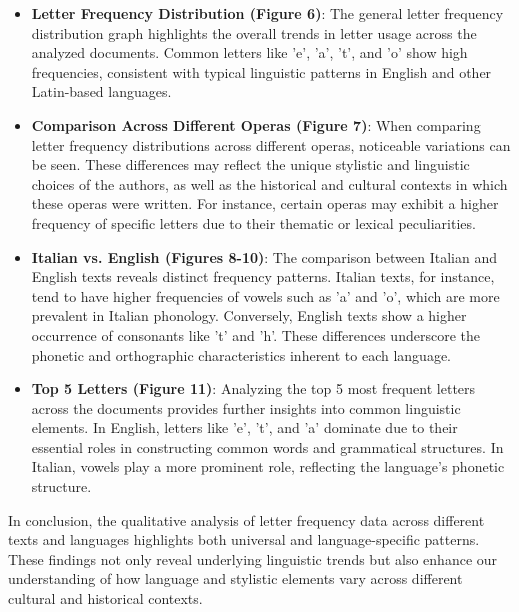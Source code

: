 \begin{itemize}
\item \textbf{Letter Frequency Distribution (Figure 6)}: The general letter frequency distribution graph highlights the overall trends in letter usage across the analyzed documents. Common letters like 'e', 'a', 't', and 'o' show high frequencies, consistent with typical linguistic patterns in English and other Latin-based languages.

\item \textbf{Comparison Across Different Operas (Figure 7)}: When comparing letter frequency distributions across different operas, noticeable variations can be seen. These differences may reflect the unique stylistic and linguistic choices of the authors, as well as the historical and cultural contexts in which these operas were written. For instance, certain operas may exhibit a higher frequency of specific letters due to their thematic or lexical peculiarities.

\item \textbf{Italian vs. English (Figures 8-10)}: The comparison between Italian and English texts reveals distinct frequency patterns. Italian texts, for instance, tend to have higher frequencies of vowels such as 'a' and 'o', which are more prevalent in Italian phonology. Conversely, English texts show a higher occurrence of consonants like 't' and 'h'. These differences underscore the phonetic and orthographic characteristics inherent to each language.

\item \textbf{Top 5 Letters (Figure 11)}: Analyzing the top 5 most frequent letters across the documents provides further insights into common linguistic elements. In English, letters like 'e', 't', and 'a' dominate due to their essential roles in constructing common words and grammatical structures. In Italian, vowels play a more prominent role, reflecting the language's phonetic structure.

\end{itemize}

\noindent In conclusion, the qualitative analysis of letter frequency data across different texts and languages highlights both universal and language-specific patterns. These findings not only reveal underlying linguistic trends but also enhance our understanding of how language and stylistic elements vary across different cultural and historical contexts.
